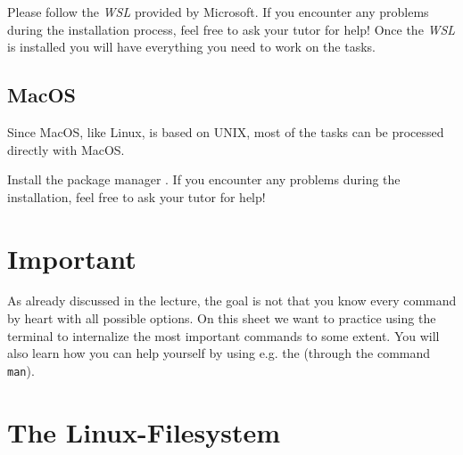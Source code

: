 \documentclass[english]{sheet}
\begin{document}
Please follow the \emph{WSL}  provided by Microsoft. If you encounter any problems during the installation process, feel free to ask your tutor for help! Once the \emph{WSL} is installed you will have everything you need to work on the tasks.

\subsection{MacOS}
Since MacOS, like Linux, is based on UNIX, most of the tasks can be processed directly with MacOS.

Install the package manager . If you encounter any problems during the installation, feel free to ask your tutor for help!

\section{Important}

As already discussed in the lecture, the goal is not that you know every command by heart with all possible options. On this sheet we want to practice using the terminal to internalize the most important commands to some extent. You will also learn how you can help yourself by using e.g. the  (through the command \texttt{man}).

\section{The Linux-Filesystem}
\end{document}
